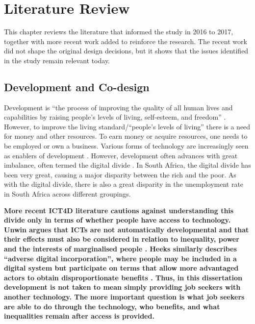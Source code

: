 \chapter{Literature Review}
\label{sec:development-codesign}

\begin{chapterintro}
This chapter reviews the literature that informed the study in 2016 to 2017, together with more recent work added to reinforce the research. The recent work did not shape the original design decisions, but it shows that the issues identified in the study remain relevant today.
\end{chapterintro}

\section{Development and Co-design}

Development is “the process of improving the quality of all human lives and capabilities by raising people’s levels of living, self-esteem, and freedom” \cite{todaro2015}. However, to improve the living standard/“people’s levels of living” \cite{todaro2015} there is a need for money and other resources. To earn money or acquire resources, one needs to be employed or own a business. Various forms of technology are increasingly seen as enablers of development \cite{npc2012}. However, development often advances with great imbalance, often termed the digital divide \cite{feldmann2003,sambasivan2010,nicola2011}. In South Africa, the digital divide has been very great, causing a major disparity between the rich and the poor. As with the digital divide, there is also a great disparity in the unemployment rate in South Africa across different groupings.

\textbf{More recent ICT4D literature cautions against understanding this divide only in terms of whether people have access to technology. Unwin argues that ICTs are not automatically developmental and that their effects must also be considered in relation to inequality, power and the interests of marginalised people \cite{unwin2017}. Heeks similarly describes “adverse digital incorporation”, where people may be included in a digital system but participate on terms that allow more advantaged actors to obtain disproportionate benefits \cite{heeks2022}. Thus, in this dissertation development is not taken to mean simply providing job seekers with another technology. The more important question is what job seekers are able to do through the technology, who benefits, and what inequalities remain after access is provided.}

